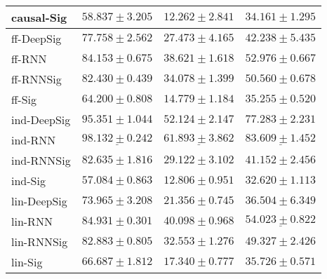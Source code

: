 \begin{tabular}{llll}
causal-Sig     &                           $ 58.837 \pm 3.205 $ &                           $ 12.262 \pm 2.841 $ &                           $ 34.161 \pm 1.295 $ \\
\midrule
ff-DeepSig     &                           $ 77.758 \pm 2.562 $ &                           $ 27.473 \pm 4.165 $ &                           $ 42.238 \pm 5.435 $ \\
ff-RNN         &                           $ 84.153 \pm 0.675 $ &                           $ 38.621 \pm 1.618 $ &                           $ 52.976 \pm 0.667 $ \\
ff-RNNSig      &                           $ 82.430 \pm 0.439 $ &                           $ 34.078 \pm 1.399 $ &                           $ 50.560 \pm 0.678 $ \\
ff-Sig         &                           $ 64.200 \pm 0.808 $ &                           $ 14.779 \pm 1.184 $ &                           $ 35.255 \pm 0.520 $ \\
\midrule
ind-DeepSig    &               $  \mathbf{ 95.351 \pm 1.044 } $ &               $  \mathbf{ 52.124 \pm 2.147 } $ &               $  \mathbf{ 77.283 \pm 2.231 } $ \\
ind-RNN        &  $  \mathbf{ \underline{ 98.132 \pm 0.242 }} $ &  $  \mathbf{ \underline{ 61.893 \pm 3.862 }} $ &  $  \mathbf{ \underline{ 83.609 \pm 1.452 }} $ \\
ind-RNNSig     &                           $ 82.635 \pm 1.816 $ &                           $ 29.122 \pm 3.102 $ &                           $ 41.152 \pm 2.456 $ \\
ind-Sig        &                           $ 57.084 \pm 0.863 $ &                           $ 12.806 \pm 0.951 $ &                           $ 32.620 \pm 1.113 $ \\
\midrule
lin-DeepSig    &                           $ 73.965 \pm 3.208 $ &                           $ 21.356 \pm 0.745 $ &                           $ 36.504 \pm 6.349 $ \\
lin-RNN        &                           $ 84.931 \pm 0.301 $ &                           $ 40.098 \pm 0.968 $ &            $  \underline{ 54.023 \pm 0.822 } $ \\
lin-RNNSig     &                           $ 82.883 \pm 0.805 $ &                           $ 32.553 \pm 1.276 $ &                           $ 49.327 \pm 2.426 $ \\
lin-Sig        &                           $ 66.687 \pm 1.812 $ &                           $ 17.340 \pm 0.777 $ &                           $ 35.726 \pm 0.571 $ \\

\end{tabular}
